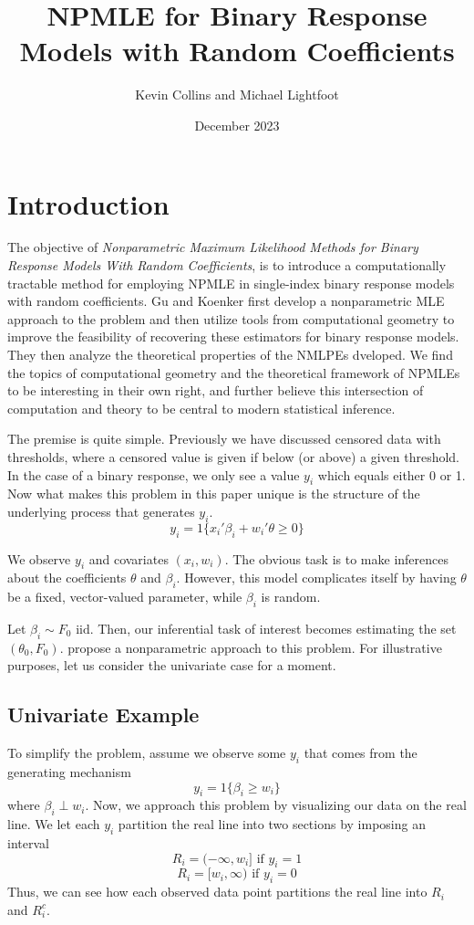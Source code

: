 \documentclass[11pt]{article}
\title{NPMLE for Binary Response Models with Random Coefficients}
\author{Kevin Collins and Michael Lightfoot}
\date{December 2023}
\begin{document}
\maketitle
\section{Introduction}

\indent

The objective of \textit{Nonparametric Maximum Likelihood Methods for Binary Response Models With Random Coefficients}, \cite{NPMLE} is to introduce a computationally tractable method for employing NPMLE in single-index binary response models with random coefficients. Gu and Koenker first develop a nonparametric MLE approach to the problem and then utilize tools from computational geometry to improve the feasibility of recovering these estimators for binary response models. They then analyze the theoretical properties of the NMLPEs dveloped. We find the topics of computational geometry and the theoretical framework of NPMLEs to be interesting in their own right, and further believe this intersection of computation and theory to be central to modern statistical inference.

The premise is quite simple. Previously we have discussed censored data with thresholds, where a censored value is given if below (or above) a given threshold. In the case of a binary response, we only see a value $y_i$ which equals either 0 or 1. Now what makes this problem in this paper unique is the structure of the underlying process that generates $y_i$.
\[
y_i = 1\{x_i'\beta_i + w_i'\theta \geq 0\}
\]

We observe $y_i$ and covariates $(x_i,w_i)$. The obvious task is to make inferences about the coefficients $\theta$ and $\beta_i$. However, this model complicates itself by having $\theta$ be a fixed, vector-valued parameter, while $\beta_i$ is random.

Let $\beta_i \sim F_0 \text{ iid}$. Then, our inferential task of interest becomes estimating the set $(\theta_0,F_0)$. \cite{NPMLE} propose a nonparametric approach to this problem. For illustrative purposes, let us consider the univariate case for a moment.

\subsection{Univariate Example}

\indent

To simplify the problem, assume we observe some $y_i$ that comes from the generating mechanism
\[
y_i=1\{\beta_i\geq w_i\}
\]
where $\beta_i\perp w_i$. Now, we approach this problem by visualizing our data on the real line. We let each $y_i$ partition the real line into two sections by imposing an interval 
\[
R_i=(-\infty,w_i] \text{ if } y_i=1 
\]
\[
R_i=[w_i,\infty) \text{ if } y_i=0
\]
Thus, we can see how each observed data point partitions the real line into $R_i$ and $R_i^c$.
\end{document}
